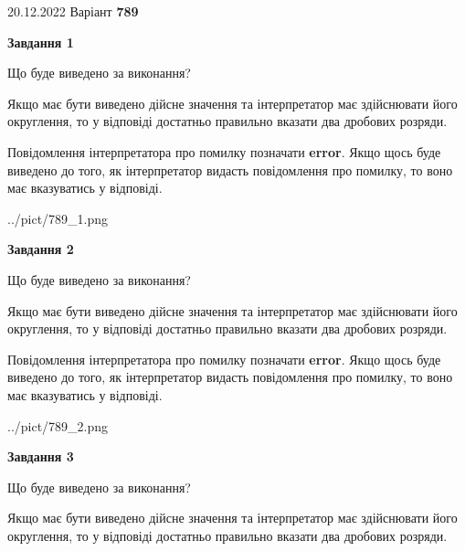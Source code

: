 \documentclass[12pt, ukrainian]{article}
\begin{document}
{20.12.2022 Варіант \No \textbf { 789 }\par}
{
\begin {Large}

{\begin {center}\textbf{Завдання 1}\end {center}}\par
Що буде виведено за виконання? \par

Якщо має бути виведено дійсне значення та інтерпретатор має здійснювати його округлення, 
то у відповіді достатньо правильно вказати два дробових розряди.

Повідомлення інтерпретатора про помилку позначати \textbf{error}.
Якщо щось буде виведено до того, як інтерпретатор видасть повідомлення про помилку, 
то воно має вказуватись у відповіді. \par

\begin{center}
	{../pict/789_1.png}
\end{center}
\newpage

{\begin {center}\textbf{Завдання 2}\end {center}}\par
Що буде виведено за виконання? \par

Якщо має бути виведено дійсне значення та інтерпретатор має здійснювати його округлення, 
то у відповіді достатньо правильно вказати два дробових розряди.

Повідомлення інтерпретатора про помилку позначати \textbf{error}.
Якщо щось буде виведено до того, як інтерпретатор видасть повідомлення про помилку, 
то воно має вказуватись у відповіді. \par

\begin{center}
	{../pict/789_2.png}
\end{center}
\newpage

{\begin {center}\textbf{Завдання 3}\end {center}}\par
Що буде виведено за виконання? \par

Якщо має бути виведено дійсне значення та інтерпретатор має здійснювати його округлення, 
то у відповіді достатньо правильно вказати два дробових розряди.


\end{Large}}
\end{document}
